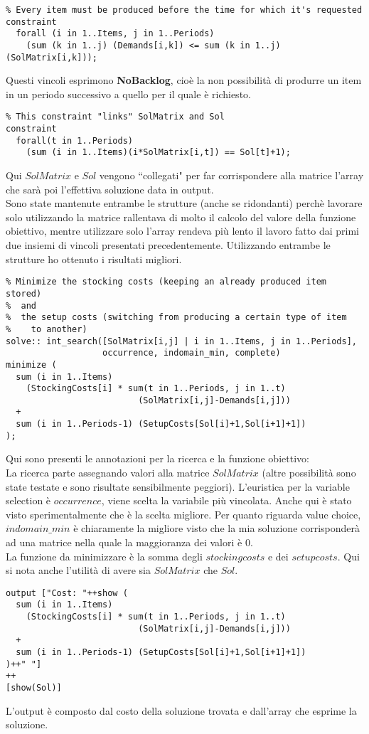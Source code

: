 \documentclass[12pt]{article}
\begin{document}
\begin{verbatim}
% Every item must be produced before the time for which it's requested
constraint
  forall (i in 1..Items, j in 1..Periods)
    (sum (k in 1..j) (Demands[i,k]) <= sum (k in 1..j) (SolMatrix[i,k]));
\end{verbatim}
Questi vincoli esprimono \textbf{NoBacklog}, cioè la non possibilità di produrre un item in un periodo successivo a quello per il quale è richiesto.

\begin{verbatim}
% This constraint "links" SolMatrix and Sol
constraint
  forall(t in 1..Periods)
    (sum (i in 1..Items)(i*SolMatrix[i,t]) == Sol[t]+1);
\end{verbatim}
Qui $SolMatrix$ e $Sol$ vengono ``collegati" per far corrispondere alla matrice l'array che sarà poi l'effettiva soluzione data in output.\\
Sono state mantenute entrambe le strutture (anche se ridondanti) perchè lavorare solo utilizzando la matrice rallentava di molto il calcolo del valore della funzione obiettivo, mentre utilizzare solo l'array rendeva più lento il lavoro fatto dai primi due insiemi di vincoli presentati precedentemente. Utilizzando entrambe le strutture ho ottenuto i risultati migliori.

\begin{verbatim}
% Minimize the stocking costs (keeping an already produced item stored)
%  and
%  the setup costs (switching from producing a certain type of item
%    to another)
solve:: int_search([SolMatrix[i,j] | i in 1..Items, j in 1..Periods],
                   occurrence, indomain_min, complete)
minimize (
  sum (i in 1..Items)
    (StockingCosts[i] * sum(t in 1..Periods, j in 1..t)
                          (SolMatrix[i,j]-Demands[i,j]))
  +
  sum (i in 1..Periods-1) (SetupCosts[Sol[i]+1,Sol[i+1]+1])
);
\end{verbatim}
Qui sono presenti le annotazioni per la ricerca e la funzione obiettivo:\\
La ricerca parte assegnando valori alla matrice $SolMatrix$ (altre possibilità sono state testate e sono risultate sensibilmente peggiori). L'euristica per la variable selection è $occurrence$, viene scelta la variabile più vincolata. Anche qui è stato visto sperimentalmente che è la scelta migliore. Per quanto riguarda value choice, $indomain\_min$ è chiaramente la migliore visto che la mia soluzione corrisponderà ad una matrice nella quale la maggioranza dei valori è 0.\\
La funzione da minimizzare è la somma degli $stocking costs$ e dei $setup costs$. Qui si nota anche l'utilità di avere sia $SolMatrix$ che $Sol$.

\begin{verbatim}
output ["Cost: "++show (
  sum (i in 1..Items)
    (StockingCosts[i] * sum(t in 1..Periods, j in 1..t)
                          (SolMatrix[i,j]-Demands[i,j]))
  +
  sum (i in 1..Periods-1) (SetupCosts[Sol[i]+1,Sol[i+1]+1])
)++" "]
++
[show(Sol)]
\end{verbatim}
L'output è composto dal costo della soluzione trovata e dall'array che esprime la soluzione.
\end{document}
